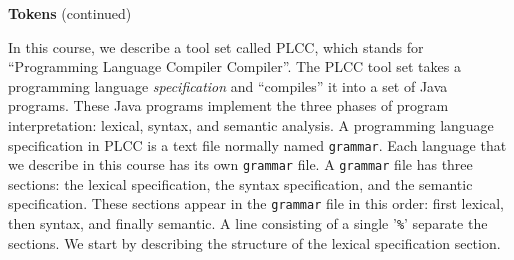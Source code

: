 \begin{minipage}[t]{\sw}
\slidenumber
\LARGE
{\bf Tokens} (continued)\exx
\centerline{}
In this course, we describe a tool set called PLCC,
which stands for ``Programming Language Compiler Compiler''.
The PLCC tool set takes a programming language {\em specification}
and ``compiles'' it into a set of Java programs.
These Java programs implement the three phases of program interpretation:
lexical, syntax, and semantic analysis.\exx
A programming language specification in PLCC
is a text file normally named \verb'grammar'.
Each language that we describe in this course
has its own \verb'grammar' file.
A \verb'grammar' file has three sections:
the lexical specification,
the syntax specification,
and the semantic specification.
These sections appear in the \verb'grammar' file in this order:
first lexical, then syntax, and finally semantic.
A line consisting of a single '\verb'%'' separate the sections.\exx
We start by describing the structure
of the lexical specification section.
\end{minipage}
\clearpage
